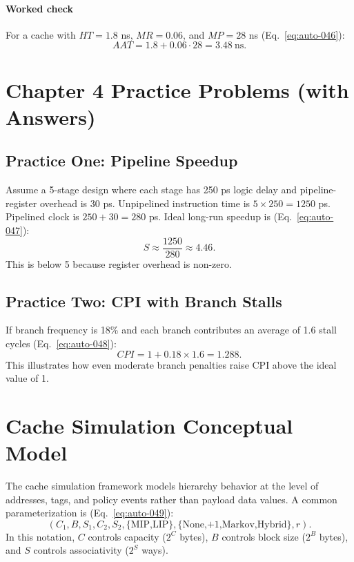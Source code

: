 \paragraph{Worked check}\label{par:auto-027}
For a cache with $HT=1.8$ ns, $MR=0.06$, and $MP=28$ ns (Eq.~\eqref{eq:auto-046}):
\begin{equation}\label{eq:auto-046}
AAT = 1.8 + 0.06\cdot 28 = 3.48\ \text{ns}.
\end{equation}

\section{Chapter 4 Practice Problems (with Answers)}\label{sec:auto-049}
\subsection*{Practice One: Pipeline Speedup}\label{subsec:auto-012}
Assume a 5-stage design where each stage has 250 ps logic delay and pipeline-register overhead is 30 ps.
Unpipelined instruction time is $5\times250=1250$ ps.
Pipelined clock is $250+30=280$ ps.
Ideal long-run speedup is (Eq.~\eqref{eq:auto-047}):
\begin{equation}\label{eq:auto-047}
S\approx\frac{1250}{280}\approx 4.46.
\end{equation}
This is below 5 because register overhead is non-zero.

\subsection*{Practice Two: CPI with Branch Stalls}\label{subsec:auto-013}
If branch frequency is 18\% and each branch contributes an average of 1.6 stall cycles (Eq.~\eqref{eq:auto-048}):
\begin{equation}\label{eq:auto-048}
CPI = 1 + 0.18\times1.6 = 1.288.
\end{equation}
This illustrates how even moderate branch penalties raise CPI above the ideal value of 1.

\section{Cache Simulation Conceptual Model}\label{sec:auto-050}
The cache simulation framework models hierarchy behavior at the level of addresses, tags, and policy events rather than payload data values.
A common parameterization is (Eq.~\eqref{eq:auto-049}):
\begin{equation}\label{eq:auto-049}
(C_1,B,S_1,C_2,S_2,\{\text{MIP,LIP}\},\{\text{None,+1,Markov,Hybrid}\},r).
\end{equation}
In this notation, $C$ controls capacity ($2^C$ bytes), $B$ controls block size ($2^B$ bytes), and $S$ controls associativity ($2^S$ ways).

